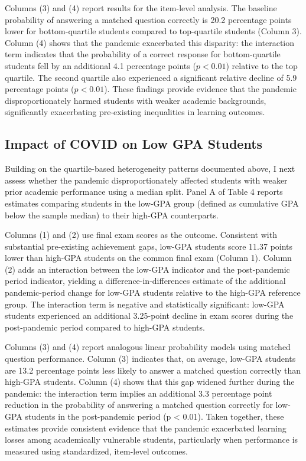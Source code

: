 \documentclass[
  12pt,
  letterpaper,
  DIV=11,
  numbers=noendperiod]{scrartcl}
\begin{document}
Columns (3) and (4) report results for the item-level analysis. The
baseline probability of answering a matched question correctly is 20.2
percentage points lower for bottom-quartile students compared to
top-quartile students (Column 3). Column (4) shows that the pandemic
exacerbated this disparity: the interaction term indicates that the
probability of a correct response for bottom-quartile students fell by
an additional 4.1 percentage points (\(p < 0.01\)) relative to the top
quartile. The second quartile also experienced a significant relative
decline of 5.9 percentage points (\(p < 0.01\)). These findings provide
evidence that the pandemic disproportionately harmed students with
weaker academic backgrounds, significantly exacerbating pre-existing
inequalities in learning outcomes.

\subsection{Impact of COVID on Low GPA
Students}\label{impact-of-covid-on-low-gpa-students}

Building on the quartile-based heterogeneity patterns documented above,
I next assess whether the pandemic disproportionately affected students
with weaker prior academic performance using a median split. Panel A of
Table 4 reports estimates comparing students in the low-GPA group
(defined as cumulative GPA below the sample median) to their high-GPA
counterparts.

Columns (1) and (2) use final exam scores as the outcome. Consistent
with substantial pre-existing achievement gaps, low-GPA students score
11.37 points lower than high-GPA students on the common final exam
(Column 1). Column (2) adds an interaction between the low-GPA indicator
and the post-pandemic period indicator, yielding a
difference-in-differences estimate of the additional pandemic-period
change for low-GPA students relative to the high-GPA reference group.
The interaction term is negative and statistically significant: low-GPA
students experienced an additional 3.25-point decline in exam scores
during the post-pandemic period compared to high-GPA students.

Columns (3) and (4) report analogous linear probability models using
matched question performance. Column (3) indicates that, on average,
low-GPA students are 13.2 percentage points less likely to answer a
matched question correctly than high-GPA students. Column (4) shows that
this gap widened further during the pandemic: the interaction term
implies an additional 3.3 percentage point reduction in the probability
of answering a matched question correctly for low-GPA students in the
post-pandemic period (p \textless{} 0.01). Taken together, these
estimates provide consistent evidence that the pandemic exacerbated
learning losses among academically vulnerable students, particularly
when performance is measured using standardized, item-level outcomes.
\end{document}
